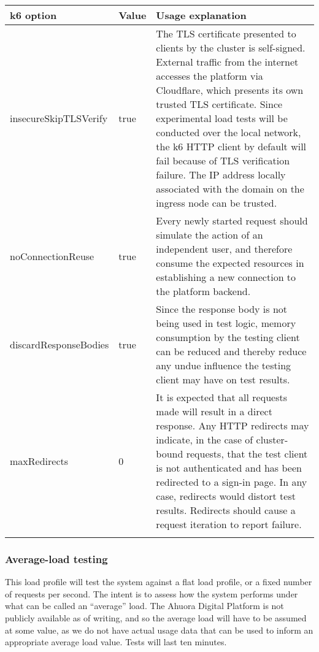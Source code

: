 \begin{tabularx}{\textwidth}{|p{}|p{}|X|}
    \hline
    \textbf{k6 option} & \textbf{Value} & \textbf{Usage explanation}  \\ \hline
    insecureSkipTLSVerify & true & The TLS certificate presented to clients by the cluster is self-signed. External traffic from the internet accesses the platform via Cloudflare, which presents its own trusted TLS certificate. Since experimental load tests will be conducted over the local network, the k6 HTTP client by default will fail because of TLS verification failure. The IP address locally associated with the domain on the ingress node can be trusted. \\ \hline
    noConnectionReuse & true & Every newly started request should simulate the action of an independent user, and therefore consume the expected resources in establishing a new connection to the platform backend.  \\ \hline
    discardResponseBodies & true & Since the response body is not being used in test logic, memory consumption by the testing client can be reduced and thereby reduce any undue influence the testing client may have on test results. \\ \hline
    maxRedirects & 0 & It is expected that all requests made will result in a direct response. Any HTTP redirects may indicate, in the case of cluster-bound requests, that the test client is not authenticated and has been redirected to a sign-in page. In any case, redirects would distort test results. Redirects should cause a request iteration to report failure. \\ \hline

    \caption{Base options set for k6 load tests}
    \label{table:k6-load-test-options}
\end{tabularx}
    

\subsubsection{Average-load testing}

This load profile will test the system against a flat load profile, or a fixed number of requests per second. The intent is to assess how the system performs under what can be called an ``average'' load. The Ahuora Digital Platform is not publicly available as of writing, and so the average load will have to be assumed at some value, as we do not have actual usage data that can be used to inform an appropriate average load value. Tests will last ten minutes.


